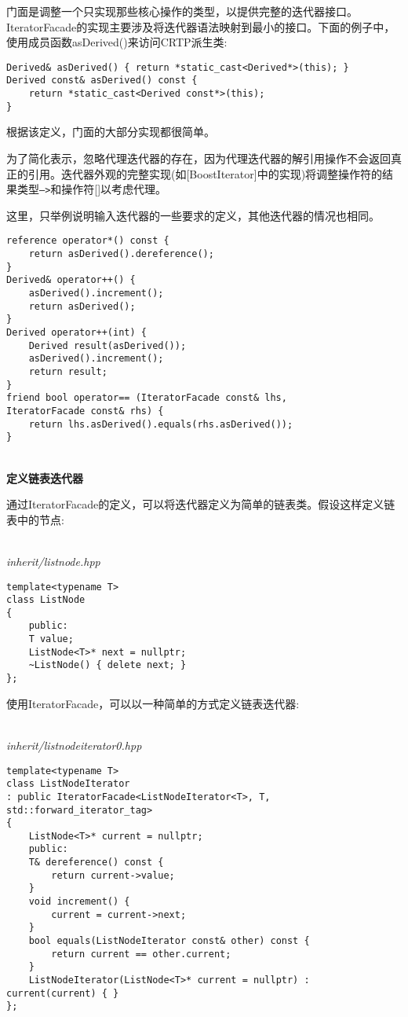 门面是调整一个只实现那些核心操作的类型，以提供完整的迭代器接口。IteratorFacade的实现主要涉及将迭代器语法映射到最小的接口。下面的例子中，使用成员函数asDerived()来访问CRTP派生类:

\begin{lstlisting}[style=styleCXX]
Derived& asDerived() { return *static_cast<Derived*>(this); }
Derived const& asDerived() const {
	return *static_cast<Derived const*>(this);
}
\end{lstlisting}

根据该定义，门面的大部分实现都很简单。

\begin{tcolorbox}[colback=webgreen!5!white,colframe=webgreen!75!black]
\hspace*{0.75cm}为了简化表示，忽略代理迭代器的存在，因为代理迭代器的解引用操作不会返回真正的引用。迭代器外观的完整实现(如[BoostIterator]中的实现)将调整操作符的结果类型\texttt{—>}和操作符[]以考虑代理。
\end{tcolorbox}

这里，只举例说明输入迭代器的一些要求的定义，其他迭代器的情况也相同。

\begin{lstlisting}[style=styleCXX]
reference operator*() const {
	return asDerived().dereference();
}
Derived& operator++() {
	asDerived().increment();
	return asDerived();
}
Derived operator++(int) {
	Derived result(asDerived());
	asDerived().increment();
	return result;
}
friend bool operator== (IteratorFacade const& lhs,
IteratorFacade const& rhs) {
	return lhs.asDerived().equals(rhs.asDerived());
}
\end{lstlisting}

\hspace*{\fill} \\ %
\noindent
\textbf{定义链表迭代器}

通过IteratorFacade的定义，可以将迭代器定义为简单的链表类。假设这样定义链表中的节点:

\hspace*{\fill} \\ %
\noindent
\textit{inherit/listnode.hpp}
\begin{lstlisting}[style=styleCXX]
template<typename T>
class ListNode
{
	public:
	T value;
	ListNode<T>* next = nullptr;
	~ListNode() { delete next; }
};
\end{lstlisting}

使用IteratorFacade，可以以一种简单的方式定义链表迭代器:

\hspace*{\fill} \\ %
\noindent
\textit{inherit/listnodeiterator0.hpp}
\begin{lstlisting}[style=styleCXX]
template<typename T>
class ListNodeIterator
: public IteratorFacade<ListNodeIterator<T>, T,
std::forward_iterator_tag>
{
	ListNode<T>* current = nullptr;
	public:
	T& dereference() const {
		return current->value;
	}
	void increment() {
		current = current->next;
	}
	bool equals(ListNodeIterator const& other) const {
		return current == other.current;
	}
	ListNodeIterator(ListNode<T>* current = nullptr) : current(current) { }
};
\end{lstlisting}

